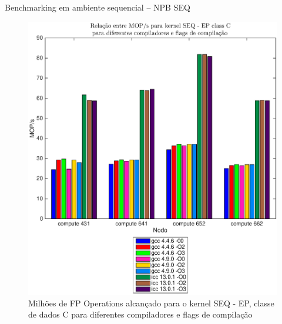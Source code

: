 \documentclass{beamer}
\begin{document}
\begin{frame}{Benchmarking em ambiente sequencial -- NPB SEQ}
\begin{figure}[H]
\centering
\includegraphics[width=1.1\columnwidth]{EPS/SEQ/MOPS_seq_ep_C.eps}
\caption{Milhões de FP Operations alcançado para o kernel SEQ - EP, classe de dados C para diferentes compiladores e flags de compilação}
\label{mops_seq_ep_c}
\end{figure}


\end{frame}
\end{document}

